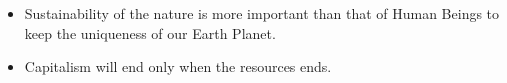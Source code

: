 \begin{itemize}
	\item Sustainability of the nature is more important than that of Human Beings to keep the uniqueness of our Earth Planet.
	\item Capitalism will end only when the resources ends.
\end{itemize}